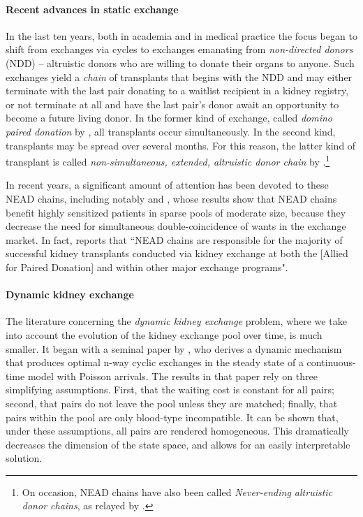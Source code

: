 \paragraph{Recent advances in static exchange} In the last ten years, both in academia and in medical practice the focus began to shift from exchanges via cycles to exchanges emanating from \emph{non-directed donors} (NDD) -- altruistic donors who are willing to donate their organs to anyone. Such exchanges yield a \emph{chain} of transplants that begins with the NDD and may either terminate with the last pair donating to a waitlist recipient in a kidney registry, or not terminate at all and have the last pair's donor await an opportunity to become a future living donor. In the former kind of exchange, called \emph{domino paired donation} by \cite{montgomery2006domino}, all transplants occur simultaneously. In the second kind, transplants may be spread over several months. For this reason, the latter kind of transplant is called \emph{non-simultaneous, extended, altruistic donor chain} by \cite{rees2009nonsimultaneous}.\footnote{On occasion, NEAD chains have also been called \emph{Never-ending altruistic donor chains}, as relayed by \cite[p.~235-6]{roth2015gets}.}

In recent years, a significant amount of attention has been devoted to these NEAD chains, including notably \cite{ashlagi2011nonsimultaneous} and \cite{ashlagi2012need}, whose results show that NEAD chains benefit highly sensitized patients in sparse pools of moderate size, because they decrease the need for simultaneous double-coincidence of wants in the exchange market. In fact, \cite{anderson2015finding} reports that ``NEAD chains are responsible for the majority of successful kidney transplants conducted via kidney exchange at both the [Allied for Paired Donation] and within other major exchange programs".

\paragraph{Dynamic kidney exchange} The literature concerning the \emph{dynamic kidney exchange} problem, where we take into account the evolution of the kidney exchange pool over time, is much smaller. It began with a seminal paper by \cite{unver2010dynamic}, who derives a dynamic mechanism that produces optimal n-way cyclic exchanges in the steady state of a continuous-time model with Poisson arrivals. The results in that paper rely on three simplifying assumptions. First, that the waiting cost is constant for all pairs; second, that pairs do not leave the pool unless they are matched; finally, that pairs within the pool are only blood-type incompatible. It can be shown that, under these assumptions, all pairs are rendered homogeneous. This dramatically decreases the dimension of the state space, and allows for an easily interpretable solution.

